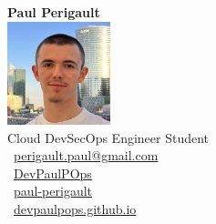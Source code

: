 \documentclass[a4paper,11pt]{article}
\begin{document}
    \begin{center}
    {\LARGE\bfseries\color{mainblue} Paul Perigault} \\[5pt]
    \includegraphics[width=3cm]{assets/Photo} \\[10pt]

    \small{Cloud DevSecOps Engineer Student} \\[5pt]
    \faEnvelope\ \href{mailto:perigault.paul@gmail.com}{perigault.paul@gmail.com} \\
    \faGithub\ \href{https://github.com/DevPaulPOps}{DevPaulPOps} \\
    \faLinkedin\ \href{https://linkedin.com/in/paul-perigault}{paul-perigault} \\
    \faGlobe\ \href{https://devpaulpops.github.io/}{devpaulpops.github.io} \\[15pt]
    \end{center}

    
    
    
    
\end{document}
